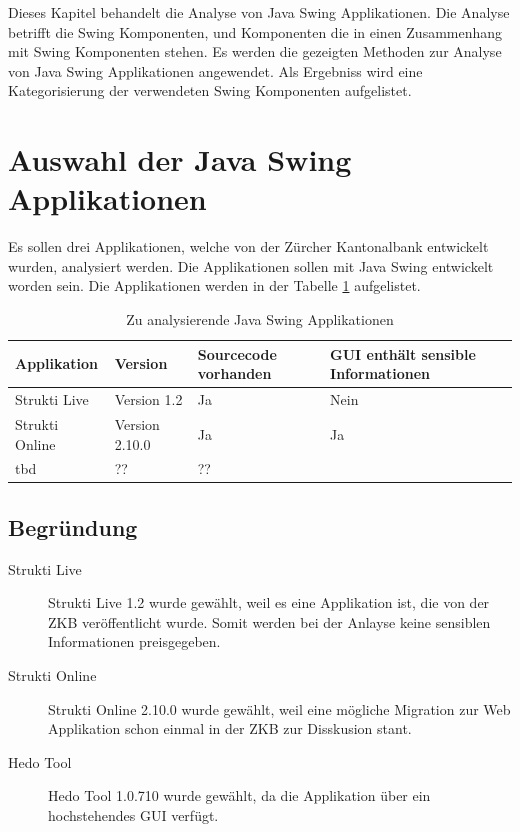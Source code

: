   Dieses Kapitel behandelt die Analyse von Java Swing Applikationen. Die
  Analyse betrifft die Swing Komponenten, und Komponenten die in einen
  Zusammenhang mit Swing Komponenten stehen. Es werden die gezeigten
  Methoden zur Analyse von Java Swing Applikationen angewendet. Als Ergebniss
  wird eine Kategorisierung der verwendeten Swing Komponenten aufgelistet.
  
  \section{Auswahl der Java Swing Applikationen}
  
  Es sollen drei Applikationen, welche von der Zürcher Kantonalbank entwickelt
  wurden, analysiert werden. Die Applikationen sollen mit Java Swing entwickelt
  worden sein. Die Applikationen werden in der Tabelle
  \ref{tab:zuAnalysierendeJavaSwingApplikationen} aufgelistet.
  \newline
  
  \begin{table}[ht]
    \sffamily 
    \begin{center}
      \begin{tabular}{llp{2cm}p{3.5cm}}
        \toprule
        Applikation & Version & Sourcecode vorhanden & GUI enthält sensible
        Informationen\\
        \midrule
        Strukti Live & Version 1.2 & Ja & Nein\\
        Strukti Online & Version 2.10.0 & Ja & Ja\\
        tbd & ?? & ??\\
        \bottomrule
      \end{tabular}
      \caption{Zu analysierende Java Swing Applikationen}
      \label{tab:zuAnalysierendeJavaSwingApplikationen}
    \end{center}
  \end{table}
  
  \subsection{Begründung}
  
  \begin{description}
  \item[Strukti Live]
  Strukti Live 1.2 wurde gewählt, weil es eine Applikation ist, die
  von der ZKB veröffentlicht wurde. Somit werden bei der Anlayse keine
  sensiblen Informationen preisgegeben.
  \item[Strukti Online]
  Strukti Online 2.10.0 wurde gewählt, weil eine mögliche Migration
  zur Web Applikation schon einmal in der \ac{ZKB} zur Disskusion stant.
  \item[Hedo Tool]
  Hedo Tool 1.0.710 wurde gewählt, da die Applikation über ein hochstehendes
  \ac{GUI} verfügt.
  \end{description}
  

